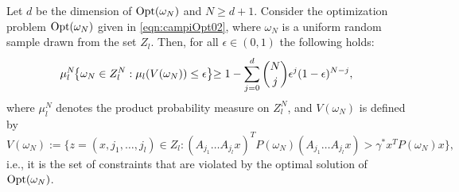 \begin{theorem}\label{mainTheorem0}
Let $d$ be the dimension of $\text{Opt}(\omega_N)$ and $N \geq d+1$. Consider the optimization problem $\text{Opt}(\omega_N)$ given in \eqref{eqn:campiOpt02}, where $\omega_N$ is a uniform random sample drawn from the set $Z_l$.
Then, for all $\epsilon \in (0,1)$ the following holds:
\begin{equation}\label{eqn:violation}
\mu_l^N\hspace{-1mm}\left\{ \omega_N \in Z_l^N: \mu_l(V(\omega_N)) \leq \epsilon \right\}\hspace{-1mm} \geq 1- \sum_{j=0}^{d} \binom{N}{j}\epsilon^j (1-\epsilon)^{N-j},\end{equation}
where $\mu_l^N$ denotes the product probability measure on $Z_l^N$, and $V(\omega_N)$ is defined by 
$$V(\omega_N) := \{z=(x,j_{1},\dots,j_{l}) \in Z_l: (A_{j_{1}}\dots A_{j_{l}} x)^T P(\omega_N)(A_{j_{1}}\dots A_{j_{l}} x) > \gamma^{*} x^T P(\omega_N) x\},$$
i.e., it is the set of constraints that are violated by the optimal solution of $\text{Opt}(\omega_N)$.
\end{theorem}



